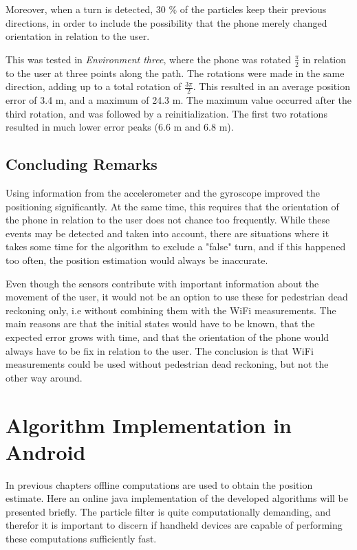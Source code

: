 \documentclass{LTHthesis}
\begin{document}
Moreover, when a turn is detected, 30 \% of the particles keep their previous directions, in order to include the possibility that the phone merely changed orientation in relation to the user.

This was tested in \emph{Environment three}, where the phone was rotated $\frac{\pi}{2}$ in relation to the user at three points along the path. The rotations were made in the same direction, adding up to a total rotation of $\frac{3\pi}{2}$. This resulted in an average position error of 3.4 m, and a maximum of 24.3 m. The maximum value occurred after the third rotation, and was followed by a reinitialization. The first two rotations resulted in much lower error peaks (6.6 m and 6.8 m).




\section{Concluding Remarks}
%
Using information from the accelerometer and the gyroscope improved the positioning significantly. At the same time, this requires that the orientation of the phone in relation to the user does not chance too frequently. While these events may be detected and taken into account, there are situations where it takes some time for the algorithm to exclude a "false" turn, and if this happened too often, the position estimation would always be inaccurate.

Even though the sensors contribute with important information about the movement of the user, it would not be an option to use these for pedestrian dead reckoning only, i.e without combining them with the WiFi measurements. The main reasons are that the initial states would have to be known, that the expected error grows with time, and that the orientation of the phone would always have to be fix in relation to the user. The conclusion is that WiFi measurements could be used without pedestrian dead reckoning, but not the other way around.






\chapter{Algorithm Implementation in Android}
\label{chap:implement}
%
In previous chapters offline computations are used to obtain the position estimate. Here an online java implementation of the developed algorithms will be presented briefly. The particle filter is quite computationally demanding, and therefor it is important to discern if handheld devices are capable of performing these computations sufficiently fast. 
\end{document}
